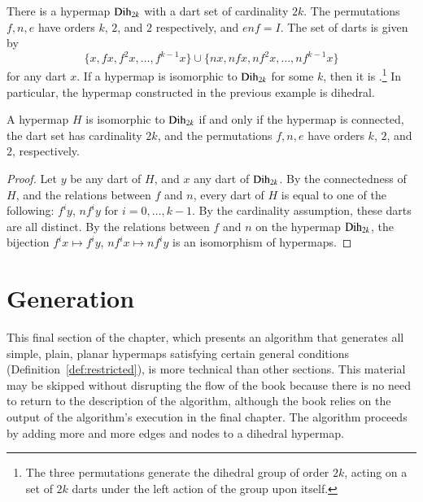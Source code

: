 \begin{example}[dihedral]\label{ex:D2k} 
There is a hypermap ${\operatorname{Dih}}_{2k}$ with a dart set of cardinality $2k$.
The permutations $f,n,e$ have  orders $k$, $2$, and $2$ respectively, and 
$e n f = I$.
The set of darts is given by
\[ 
\{x, f x,f^2 x,\ldots,f^{k-1} x\}\cup \{n x, n f x, n f^2 x,\ldots, n f^{k-1} x\}
\] 
for any dart $x$.
If a hypermap is isomorphic to ${\operatorname{Dih}}_{2k}$ for
some $k$, then it is .\footnote{The three permutations generate the dihedral
group of order $2k$, acting on a set of $2k$ darts under the left action of the group upon itself.}   
In particular,
the hypermap constructed in the previous example is dihedral.
%
\end{example}

\begin{lemma}\cutrate{}\label{lemma:dih-iso}
  A hypermap $H$ is isomorphic to ${\operatorname{Dih}}_{2k}$ if and only if the
  hypermap is connected, the dart set has cardinality $2k$, and the
  permutations $f,n,e$ have orders $k$, $2$, and $2$, respectively.
\end{lemma}

\begin{proof} Let $y$ be any dart of $H$, and $x$ any dart of ${\operatorname{Dih}}_{2k}$.
By the connectedness of $H$, and the relations between $f$ and $n$, every dart of $H$ is
equal to one of the following: $f^i y$, $n f^i y$ for $i=0,\ldots,k-1$.  By the cardinality assumption,
these darts are all distinct.  By the relations between $f$ and $n$ on the hypermap ${\operatorname{Dih}}_{2k}$,
the bijection $f^i x \mapsto f^i y$, $n f^i x \mapsto n f^i y$ is an isomorphism of hypermaps.
\end{proof}


\section{Generation}\label{sec:generation}
%

This final section of the chapter, which presents an algorithm that
generates all simple, plain, planar hypermaps satisfying certain
general conditions (Definition~\ref{def:restricted}), is more
technical than other sections.  This material may be skipped without
disrupting the flow of the book because there is no need to return to
the description of the algorithm, although the book relies on the
output of the algorithm's execution in the final chapter.  The
algorithm proceeds by adding more and more edges and nodes to a
dihedral hypermap.

